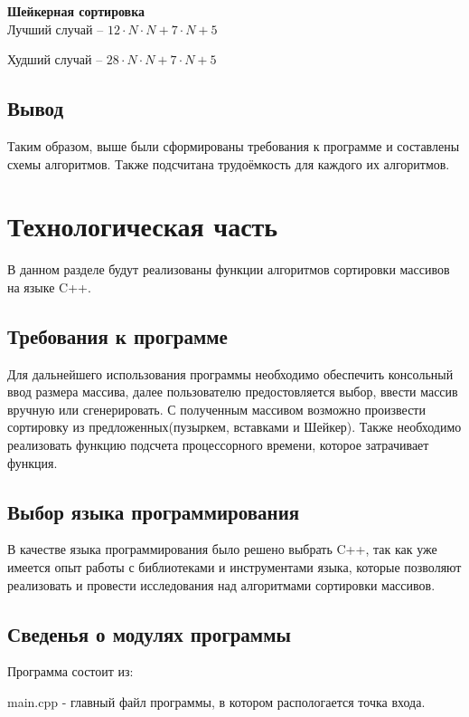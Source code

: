 \documentclass[12pt,a4paper]{report}
\begin{document}
\textbf{Шейкерная сортировка} \\

Лучший случай -- $12 \cdot N \cdot N + 7 \cdot N + 5$

Худший случай -- $28 \cdot N \cdot N + 7 \cdot N + 5$

\section*{Вывод}

Таким образом, выше были сформированы требования к программе и составлены схемы алгоритмов.
Также подсчитана трудоёмкость для каждого их алгоритмов.

\newpage
\chapter{Технологическая часть} 


В данном разделе будут реализованы функции алгоритмов сортировки массивов на языке C++.

\section{Требования к программе}

Для дальнейшего использования программы необходимо обеспечить 
консольный ввод размера массива, далее пользователю предостовляется 
выбор, ввести массив вручную или сгенерировать. С полученным массивом
возможно произвести сортировку из предложенных(пузыркем, вставками и Шейкер).
Также необходимо реализовать функцию подсчета процессорного времени,
которое затрачивает функция.

\section{Выбор языка программирования}

В качестве языка программирования было решено выбрать C++, 
так как уже имеется опыт работы с библиотеками и инструментами
языка, которые позволяют реализовать и провести исследования над 
алгоритмами сортировки массивов.

\section{Сведенья о модулях программы}

Программа состоит из:

main.cpp -  главный файл программы, в котором распологается точка входа.
\end{document}
